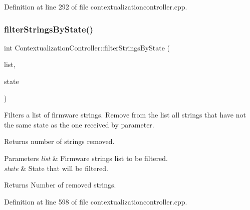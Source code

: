 Definition at line 292 of file contextualizationcontroller.\+cpp.

\mbox{\label{classContextualizationController_a627fba866e282e4e7dff813781ed88cb}} 
\subsubsection{\texorpdfstring{filter\+Strings\+By\+State()}{filterStringsByState()}}
{\footnotesize\ttfamily int Contextualization\+Controller\+::filter\+Strings\+By\+State (\begin{DoxyParamCaption}\item[{Q\+List$<$ \mbox{\hyperlink{classFirmwareString}{Firmware\+String}} $\ast$$>$ $\ast$}]{list,  }\item[{const Q\+String \&}]{state }\end{DoxyParamCaption})\hspace{0.3cm}{\ttfamily [protected]}}



Filters a list of firmware strings. Remove from the list all strings that have not the same state as the one received by parameter. 

Returns number of strings removed. 
\begin{DoxyParams}{Parameters}
{\em list} & Firmware strings list to be filtered. \\
\hline
{\em state} & State that will be filtered. \\
\hline
\end{DoxyParams}
\begin{DoxyReturn}{Returns}
Number of removed strings. 
\end{DoxyReturn}


Definition at line 598 of file contextualizationcontroller.\+cpp.

\mbox{\label{classContextualizationController_a5f94a4894e3a3c0920dc534346527fa0}} 
